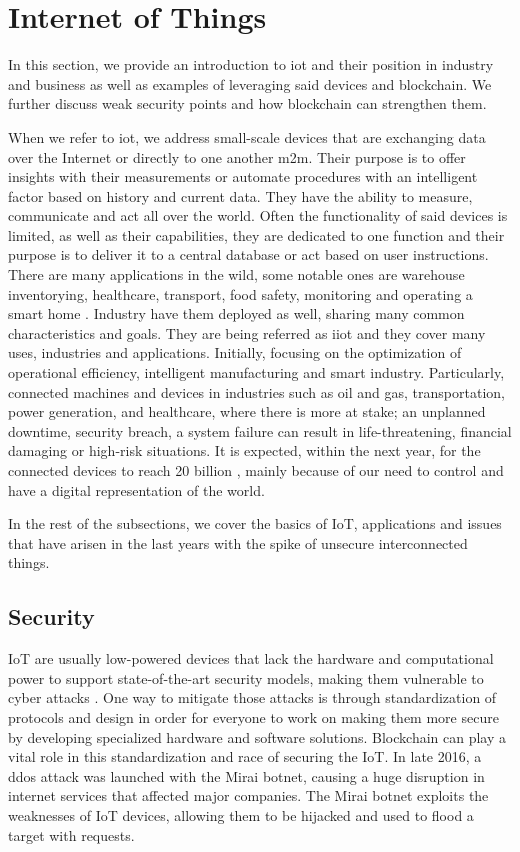 \section{Internet of Things}
In this section, we provide an introduction to \acrfull{iot} and their position in industry and business as well as examples of leveraging said devices and blockchain. We further discuss weak security points and how blockchain can strengthen them.  

When we refer to \acrshort{iot}, we address small-scale devices that are exchanging data over the Internet or directly to one another \acrshort{m2m}. Their purpose is to offer insights with their measurements or automate procedures with an intelligent factor based on history and current data. They have the ability to measure, communicate and act all over the world. Often the functionality of said devices is limited, as well as their capabilities, they are dedicated to one function and their purpose is to deliver it to a central database or act based on user instructions. There are many applications in the wild, some notable ones are warehouse inventorying, healthcare, transport, food safety, monitoring and operating a smart home \cite{casino2018systematic}. Industry have them deployed as well, sharing many common characteristics and goals. They are being referred as \acrfull{iiot} and they cover many uses, industries and applications. Initially, focusing on the optimization of operational efficiency, intelligent manufacturing and smart industry. Particularly, connected machines and devices in industries such as oil and gas, transportation, power generation, and healthcare, where there is more at stake; an unplanned downtime, security breach, a system failure can result in life-threatening, financial damaging or high-risk situations. It is expected, within the next year, for the connected devices to reach 20 billion \cite{hung2017leading}, mainly because of our need to control and have a digital representation of the world. 

In the rest of the subsections, we cover the basics of IoT, applications and issues that have arisen in the last years with the spike of unsecure interconnected things.

\subsection{Security}
IoT are usually low-powered devices that lack the hardware and computational power to support state-of-the-art security models, making them vulnerable to cyber attacks \cite{kolias2015securely}. One way to mitigate those attacks is through standardization of protocols and design in order for everyone to work on making them more secure by developing specialized hardware and software solutions. Blockchain can play a vital role in this standardization and race of securing the IoT. In late 2016, a \acrshort{ddos} attack was launched with the Mirai botnet, causing a huge disruption in internet services that affected major companies. The Mirai botnet exploits the weaknesses of IoT devices, allowing them to be hijacked and used to flood a target with requests\cite{kolias2017ddos}.

